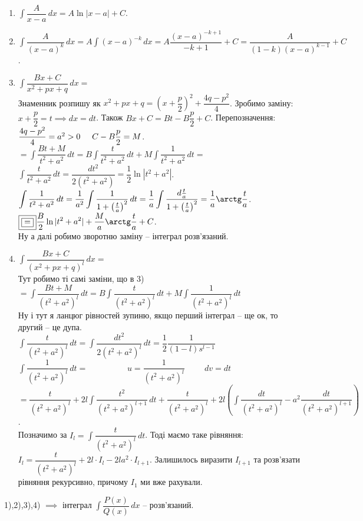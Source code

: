 \documentclass[a4paper, 10pt]{article}
\def\huge{\displaystyle}
\theoremstyle{theoremdd}
\theoremstyle{theoremdd}
\theoremstyle{theoremdd}
\theoremstyle{theoremdd}
\theoremstyle{theoremdd}
\theoremstyle{theoremdd}
\theoremstyle{theoremdd}
\theoremstyle{theoremdd}
\theoremstyle{theoremdd}
\begin{document}
\begin{enumerate}[wide=0pt,label={\arabic*)}]
\item $\huge \int \dfrac{A}{x-a}\,dx = A\ln|x-a| + C$.

\item $\huge \int \dfrac{A}{(x-a)^k}\,dx = A\int (x-a)^{-k}\,dx = A\dfrac{(x-a)^{-k+1}}{-k+1} + C = \dfrac{A}{(1-k)(x-a)^{k-1}} + C$.

\item $\huge \int \dfrac{Bx+C}{x^2+px+q}\,dx \boxed{=}$\\
Знаменник розпишу як $x^2 + px + q = \left(x + \dfrac{p}{2} \right)^2 + \dfrac{4q-p^2}{4}$. Зробимо заміну: $x + \dfrac{p}{2} = t \implies dx = dt$. Також $Bx+C = Bt - B\dfrac{p}{2} + C$. Перепозначення: $\dfrac{4q-p^2}{4} = a^2 > 0 \hspace{0.5cm} C - B \dfrac{p}{2} = M$.\\
$\boxed{=} \huge \int \dfrac{Bt + M}{t^2 + a^2}\,dt = B \int \dfrac{t}{t^2+a^2}\,dt + M \int \dfrac{1}{t^2+a^2}\,dt \boxed{\boxed{=}}$\\
$\huge \int \dfrac{t}{t^2+a^2}\,dt = \dfrac{dt^2}{2(t^2+a^2)} = \dfrac{1}{2} \ln|t^2+a^2|$.\\
$\huge \int \dfrac{1}{t^2+a^2}\,dt = \dfrac{1}{a^2} \int \dfrac{1}{1 + \left(\frac{t}{a}\right)^2}\,dt = \dfrac{1}{a} \int \dfrac{d \frac{t}{a}}{1 + \left(\frac{t}{a}\right)^2} = \dfrac{1}{a} \arctg \dfrac{t}{a}$.\\
$\boxed{\boxed{=}} \huge \frac{B}{2} \ln|t^2+a^2| + \frac{M}{a} \arctg \frac{t}{a} + C$.\\
Ну а далі робимо зворотню заміну -- інтеграл розв'язаний.

\item $\huge \int \dfrac{Bx+C}{(x^2+px+q)^l}\,dx \boxed{=}$\\
Тут робимо ті самі заміни, що в 3)\\
$\boxed{=} \huge \int \dfrac{Bt+M}{(t^2+a^2)^l}\,dt = B \int \dfrac{t}{(t^2+a^2)^l} \,dt + M \int \dfrac{1}{(t^2+a^2)^l}\,dt$\\
Ну і тут я ланцюг рівностей зупиню, якщо перший інтеграл -- ще ок, то другий -- це дупа.\\
$\huge \int \dfrac{t}{(t^2+a^2)^l}\,dt = \int \dfrac{dt^2}{2(t^2+a^2)^l}\,dt = \dfrac{1}{2} \dfrac{1}{(1-l)s^{l-1}}$ \bigskip \\
$\huge \int \dfrac{1}{(t^2+a^2)^l}\,dt \boxed{=} \hspace{2cm} u = \dfrac{1}{(t^2+a^2)^l} \hspace{1cm} dv = dt$\\
$\boxed{=} \huge \dfrac{t}{(t^2+a^2)^l} + 2l \int \dfrac{t^2}{(t^2+a^2)^{l+1}}\,dt + \dfrac{t}{(t^2+a^2)^l} + 2l \left(\int \dfrac{dt}{(t^2+a^2)^l} - a^2 \dfrac{dt}{(t^2+a^2)^{l+1}} \right)$.\\
Позначимо за $I_l = \huge \int \dfrac{t}{(t^2+a^2)^l}\,dt$. Тоді маємо таке рівняння: $I_l = \dfrac{t}{(t^2+a^2)^l} + 2l \cdot I_l - 2la^2 \cdot I_{l+1}$. Залишилось виразити $I_{l+1}$ та розв'язати рівняння рекурсивно, причому $I_1$ ми вже рахували.
\end{enumerate}
1),2),3),4) $\implies$ інтеграл $\huge\int \dfrac{P(x)}{Q(x)}\,dx$ -- розв'язаний.
\end{document}
